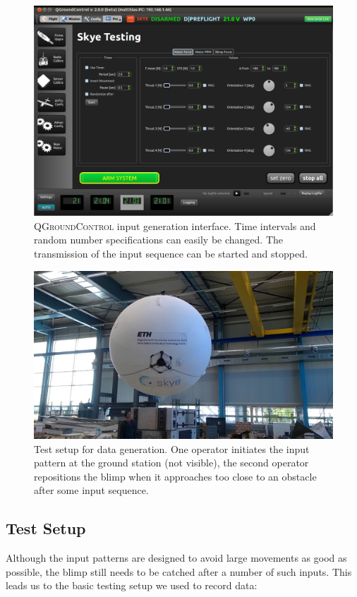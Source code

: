 \begin{figure}[H]
\centering
\includegraphics[width=.9\textwidth]{images/qgc/QGroundControl_v_2.png}
\caption{\textsc{QGroundControl} input generation interface. Time intervals and random number specifications can easily be changed. The transmission of the input sequence can be started and stopped.}
\label{fig:qgc_input_gen}
\end{figure}

\begin{figure}[H]
\centering
\includegraphics[width=.9\textwidth]{images/foto_testing_setup.jpg}
\caption{Test setup for data generation. One operator initiates the input pattern at the ground station (not visible), the second operator repositions the blimp when it approaches too close to an obstacle after some input sequence.}
\label{fig:test_setup}
\end{figure}

\subsection{Test Setup}
\label{sub:testing_setup}
Although the input patterns are designed to avoid large movements as good as possible, the blimp still needs to be catched after a number of such inputs.
This leads us to the basic testing setup we used to record data: \\

